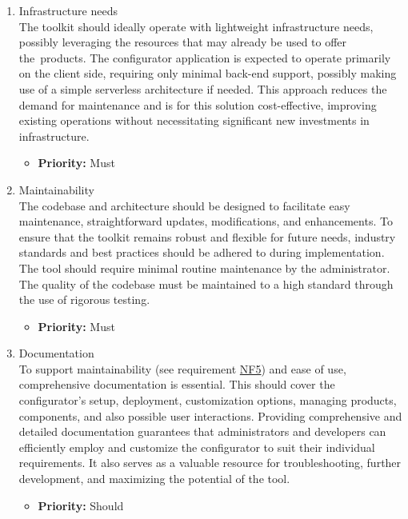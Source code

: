 \begin{enumerate}[label=\textbf{NF\arabic*:}, leftmargin=*]
\item \label{itm:NF4} Infrastructure needs
\vspace{2pt}
\\The toolkit should ideally operate with lightweight infrastructure needs, possibly leveraging the resources that may already be used to offer the~products. The configurator application is expected to operate primarily on the client side, requiring only minimal back-end support, possibly making use of a simple serverless architecture if needed. This approach reduces the demand for maintenance and is for this solution cost-effective, improving existing operations without necessitating significant new investments in infrastructure.
\begin{itemize}[noitemsep, label=\trianglebullet]
    \item \textbf{Priority:} Must
\end{itemize}
\vspace{4pt}

\item \label{itm:NF5} Maintainability
\vspace{2pt}
\\The codebase and architecture should be designed to facilitate easy maintenance, straightforward updates, modifications, and enhancements. To ensure that the toolkit remains robust and flexible for future needs, industry standards and best practices should be adhered to during implementation. The tool should require minimal routine maintenance by the administrator. The quality of the codebase must be maintained to a high standard through the use of rigorous testing.
\begin{itemize}[noitemsep, label=\trianglebullet]
    \item \textbf{Priority:} Must
\end{itemize}
\vspace{4pt}

\item Documentation
\vspace{2pt}
\\To support maintainability (see requirement \hyperref[itm:NF5]{NF5}) and ease of use, comprehensive documentation is essential. This should cover the configurator's setup, deployment, customization options, managing products, components, and also possible user interactions. Providing comprehensive and detailed documentation guarantees that administrators and developers can efficiently employ and customize the configurator to suit their individual requirements. It also serves as a valuable resource for troubleshooting, further development, and maximizing the potential of the tool.
\begin{itemize}[noitemsep, label=\trianglebullet]
    \item \textbf{Priority:} Should
\end{itemize}
\vspace{4pt}


\end{enumerate}
